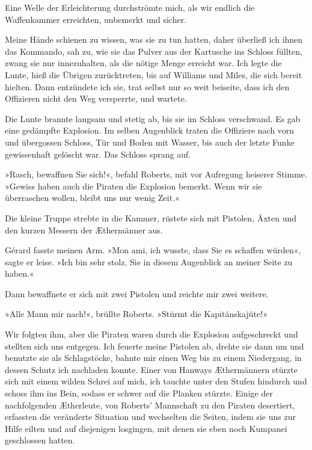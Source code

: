 \bigpar

Eine Welle der Erleichterung durchströmte mich, als wir endlich die
Waffenkammer erreichten, unbemerkt und sicher.

Meine Hände schienen zu wissen, was sie zu tun hatten, daher
überließ ich ihnen das Kommando, sah zu, wie sie das Pulver aus der
Kartusche ins Schloss füllten, zwang sie nur innezuhalten, als die
nötige Menge erreicht war. Ich legte die Lunte, hieß die Übrigen
zurücktreten, bis auf Williams und Miles, die sich bereit hielten.
Dann entzündete ich sie, trat selbst nur so weit beiseite, dass ich
den Offizieren nicht den Weg versperrte, und wartete.

Die Lunte brannte langsam und stetig ab, bis sie im Schloss
verschwand. Es gab eine gedämpfte Explosion. Im selben Augenblick
traten die Offiziere nach vorn und übergossen Schloss, Tür und
Boden mit Wasser, bis auch der letzte Funke gewissenhaft gelöscht
war. Das Schloss sprang auf.

»Rasch, bewaffnen Sie sich!«, befahl Roberts, mit vor Aufregung
heiserer Stimme. »Gewiss haben auch die Piraten die Explosion
bemerkt. Wenn wir sie überraschen wollen, bleibt uns nur wenig
Zeit.«

Die kleine Truppe strebte in die Kammer, rüstete sich mit Pistolen,
Äxten und den kurzen Messern der Æthermänner aus.

Gérard fasste meinen Arm. »Mon ami, ich wusste, dass Sie es
schaffen würden«, sagte er leise. »Ich bin sehr stolz, Sie in
diesem Augenblick an meiner Seite zu haben.«

Dann bewaffnete er sich mit zwei Pistolen und reichte mir zwei
weitere.

»Alle Mann mir nach!«, brüllte Roberts. »Stürmt die
Kapitänskajüte!«

Wir folgten ihm, aber die Piraten waren durch die Explosion
aufgeschreckt und stellten sich uns entgegen. Ich feuerte meine
Pistolen ab, drehte sie dann um und benutzte sie als Schlagstöcke,
bahnte mir einen Weg bis zu einem Niedergang, in dessen Schutz ich
nachladen konnte. Einer von Hanways Æthermännern stürzte sich mit
einem wilden Schrei auf mich, ich tauchte unter den Stufen hindurch
und schoss ihm ins Bein, sodass er schwer auf die Planken stürzte.
Einige der nachfolgenden Ætherleute, von Roberts’ Mannschaft zu den
Piraten desertiert, erfassten die veränderte Situation und
wechselten die Seiten, indem sie uns zur Hilfe eilten und auf
diejenigen losgingen, mit denen sie eben noch Kumpanei geschlossen
hatten.

